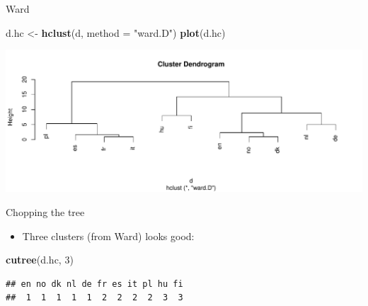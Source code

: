 \documentclass[
  ignorenonframetext,
]{beamer}
\newenvironment{Shaded}{\begin{snugshade}}{\end{snugshade}}
\newcommand{\DataTypeTok}[1]{\textcolor[rgb]{0.13,0.29,0.53}{#1}}
\newcommand{\DecValTok}[1]{\textcolor[rgb]{0.00,0.00,0.81}{#1}}
\newcommand{\KeywordTok}[1]{\textcolor[rgb]{0.13,0.29,0.53}{\textbf{#1}}}
\newcommand{\NormalTok}[1]{#1}
\newcommand{\StringTok}[1]{\textcolor[rgb]{0.31,0.60,0.02}{#1}}
\providecommand{\tightlist}{%
  \setlength{\itemsep}{0pt}\setlength{\parskip}{0pt}}
\begin{document}
\begin{frame}[fragile]{Ward}
\protect\hypertarget{ward}{}

\begin{Shaded}
\begin{Highlighting}[]
\NormalTok{d.hc <-}\StringTok{ }\KeywordTok{hclust}\NormalTok{(d, }\DataTypeTok{method =} \StringTok{"ward.D"}\NormalTok{)}
\KeywordTok{plot}\NormalTok{(d.hc)}
\end{Highlighting}
\end{Shaded}

\includegraphics{slides_d29_files/figure-beamer/wardo-1.pdf}

\end{frame}

\begin{frame}[fragile]{Chopping the tree}
\protect\hypertarget{chopping-the-tree}{}

\begin{itemize}
\tightlist
\item
  Three clusters (from Ward) looks good:
\end{itemize}

\begin{Shaded}
\begin{Highlighting}[]
\KeywordTok{cutree}\NormalTok{(d.hc, }\DecValTok{3}\NormalTok{)}
\end{Highlighting}
\end{Shaded}

\begin{verbatim}
## en no dk nl de fr es it pl hu fi 
##  1  1  1  1  1  2  2  2  2  3  3
\end{verbatim}

\end{frame}
\end{document}
